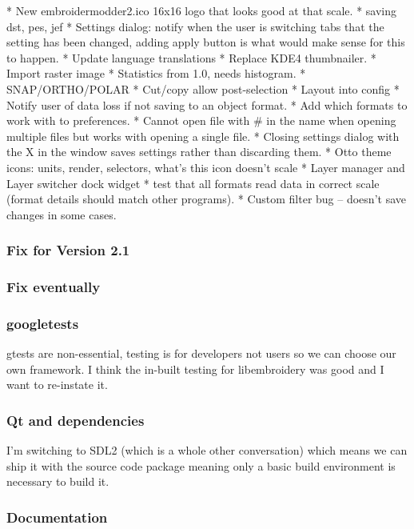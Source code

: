 \documentclass[10pt]{report}
\begin{document}
\begin{itemize}
* New embroidermodder2.ico 16x16 logo that looks good at that scale.
* saving dst, pes, jef
* Settings dialog: notify when the user is switching tabs that the setting has been changed, adding apply button is what would make sense for this to happen.
* Update language translations
* Replace KDE4 thumbnailer.
* Import raster image
* Statistics from 1.0, needs histogram.
* SNAP/ORTHO/POLAR
* Cut/copy allow post-selection
* Layout into config
* Notify user of data loss if not saving to an object format.
* Add which formats to work with to preferences.
* Cannot open file with \# in the name when opening multiple files but  works
  with opening a single file.
* Closing settings dialog with the X in the window saves settings rather than discarding them.
* Otto theme icons: units, render, selectors, what's this icon doesn't scale
* Layer manager and Layer switcher dock widget
*  test that all formats read data in correct scale (format details should match other programs).
* Custom filter bug -- doesn't save changes in some cases.
\end{itemize}

\subsubsection{Fix for Version 2.1}

\subsubsection{Fix eventually}

\subsubsection{googletests}

gtests are non-essential, testing is for developers not users so we can
choose our own framework. I think the in-built testing for libembroidery
was good and I want to re-instate it.

\subsubsection{Qt and dependencies}

I'm switching to SDL2 (which is a whole other conversation) which means
we can ship it with the source code package meaning only a basic build
environment is necessary to build it.

\subsubsection{Documentation}
\end{document}
